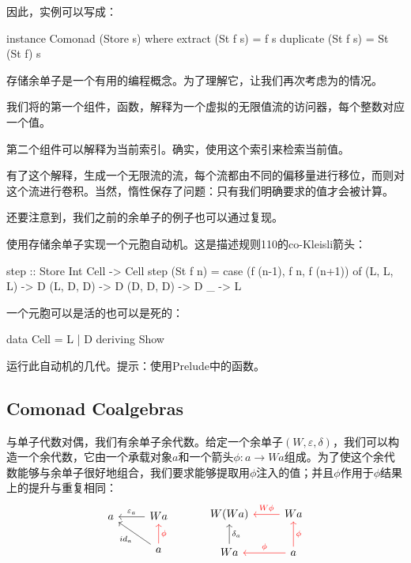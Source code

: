\documentclass[DaoFP]{subfiles}
\begin{document}
因此，实例可以写成：
\begin{haskell}
instance Comonad (Store s) where
extract (St f s) = f s
duplicate (St f s) = St (St f) s
\end{haskell}

存储余单子是一个有用的编程概念。为了理解它，让我们再次考虑为的情况。

我们将的第一个组件，函数，解释为一个虚拟的无限值流的访问器，每个整数对应一个值。

第二个组件可以解释为当前索引。确实，使用这个索引来检索当前值。

有了这个解释，生成一个无限流的流，每个流都由不同的偏移量进行移位，而则对这个流进行卷积。当然，惰性保存了问题：只有我们明确要求的值才会被计算。

还要注意到，我们之前的余单子的例子也可以通过复现。

\begin{exercise}
使用存储余单子实现一个元胞自动机。这是描述规则110的co-Kleisli箭头：
\begin{haskell}
step :: Store Int Cell -> Cell
step (St f n) =
case (f (n-1), f n, f (n+1)) of
(L, L, L) -> D
(L, D, D) -> D
(D, D, D) -> D
_ -> L
\end{haskell}
一个元胞可以是活的也可以是死的：
\begin{haskell}
data Cell = L | D
deriving Show
\end{haskell}
运行此自动机的几代。提示：使用Prelude中的函数。
\end{exercise}

\subsection{Comonad Coalgebras}

与单子代数对偶，我们有余单子余代数。给定一个余单子$(W, \varepsilon, \delta)$，我们可以构造一个余代数，它由一个承载对象$a$和一个箭头$\phi \colon a \to W a$组成。为了使这个余代数能够与余单子很好地组合，我们要求能够提取用$\phi$注入的值；并且$\phi$作用于$\phi$结果上的提升与重复相同：
\[
\begin{tikzcd}
a
& W a
\arrow[l, "\varepsilon_a"']
\\
& a
\arrow[ul, "id_a"]
\arrow[u, red, "\phi"']
\end{tikzcd}
\hspace{30pt}
\begin{tikzcd}
W(W a)
&W a
\arrow[l, red, "W \phi "']
\\
W a
\arrow[u, "\delta_a"']
& a
\arrow[l, red, "\phi"']
\arrow[u, red, "\phi"']
\end{tikzcd}
\]
\end{document}
